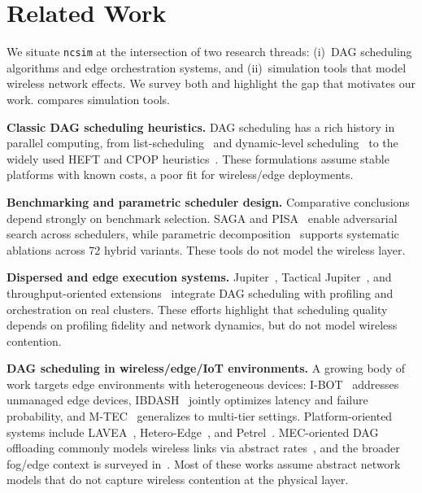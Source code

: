 \documentclass[conference]{IEEEtran}
\newcommand{\ncsim}{\texttt{ncsim}}
\begin{document}
\section{Related Work}
\label{sec:related}

We situate \ncsim{} at the intersection of two research threads: (i)~DAG
scheduling algorithms and edge orchestration systems, and (ii)~simulation
tools that model wireless network effects.  We survey both and highlight the
gap that motivates our work.   compares simulation tools.

\textbf{Classic DAG scheduling heuristics.}
DAG scheduling has a rich history in parallel computing, from
list-scheduling~\cite{Adam1974ListSchedules,KwokAhmad1999Survey} and
dynamic-level scheduling~\cite{Sih1993DLS} to the widely used
HEFT and CPOP heuristics~\cite{heft}.  These formulations assume stable
platforms with known costs, a poor fit for wireless/edge deployments.

\textbf{Benchmarking and parametric scheduler design.}
Comparative conclusions depend strongly on benchmark selection.  SAGA and
PISA~\cite{Coleman2024PISA,SAGARepo} enable adversarial search across
schedulers, while parametric decomposition~\cite{Coleman2024Parametric}
supports systematic ablations across 72 hybrid variants.  These tools do
not model the wireless layer.

\textbf{Dispersed and edge execution systems.}
Jupiter~\cite{Ghosh2021Jupiter}, Tactical
Jupiter~\cite{Poylisher2021TacticalJupiter}, and throughput-oriented
extensions~\cite{Zhao2021TPHEFT} integrate DAG scheduling with profiling
and orchestration on real clusters.  These efforts highlight that scheduling
quality depends on profiling fidelity and network dynamics, but do not model
wireless contention.

\textbf{DAG scheduling in wireless/edge/IoT environments.}
A growing body of work targets edge environments with heterogeneous devices:
I-BOT~\cite{Suryavansh2020IBOT} addresses unmanaged edge devices,
IBDASH~\cite{Li2022IBDASH} jointly optimizes latency and failure
probability, and M-TEC~\cite{Li2024MTEC} generalizes to multi-tier
settings.  Platform-oriented systems include
LAVEA~\cite{Yi2017LAVEA}, Hetero-Edge~\cite{Zhang2019HeteroEdge},
and Petrel~\cite{Lin2019Petrel}.  MEC-oriented DAG offloading commonly
models wireless links via abstract
rates~\cite{Liang2021JointOffloading,Li2024EnergyConstrained,Long2025SecDS},
and the broader fog/edge context is surveyed
in~\cite{Chiang2016FogIoT,Chiang2017Fog10Q,Kim2020CodedEdge}.
Most of these works assume abstract network models that do not capture
wireless contention at the physical layer.
\end{document}
